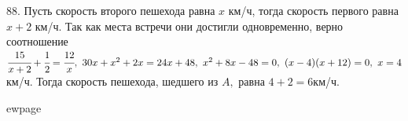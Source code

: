 88. Пусть скорость второго пешехода равна $x$ км/ч, тогда скорость первого равна $x+2$ км/ч. Так как места встречи они достигли одновременно, верно соотношение $\cfrac{15}{x+2}+\cfrac{1}{2}=\cfrac{12}{x},\
30x+x^2+2x=24x+48,\ x^2+8x-48=0,\ (x-4)(x+12)=0,\ x=4$км/ч. Тогда скорость пешехода, шедшего из $A,$ равна $4+2=6$км/ч.

ewpage
